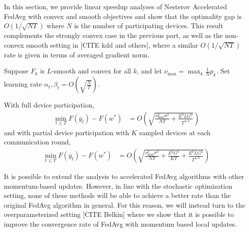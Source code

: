 In this section, we provide linear speedup analyses of Nesterov Accelerated
FedAvg with convex and smooth objectives and show that the optimality
gap is $O(1/\sqrt{NT})$ where $N$ is the number of participating
devices. This result complements the strongly convex case in the previous
part, as well as the non-convex smooth setting in {[}CITE kdd and
others{]}, where a similar $O(1/\sqrt{NT})$ rate is given in terms
of averaged gradient norm. 
\begin{theorem}
	Suppose $F_{k}$ is $L$-smooth and convex for all $k$, and let $\nu_{\max}=\max_{k}\frac{1}{N}p_{k}$.
	Set learning rate $\alpha_{t},\beta_{t}=O(\sqrt{\frac{N}{T}})$.
	
	With full device participation, 
	\begin{align*}
	\min_{t\leq T}F(\overline{y}_{t})-F(w^{\ast}) & =O(\sqrt{\frac{\nu_{\max}^{2}\sigma^{2}}{NT}+\frac{E^{2}LG^{2}}{T^{4/3}}})
	\end{align*}
	and with partial device participation with $K$ sampled devices at
	each communication round, 
	\begin{align*}
	\min_{t\leq T}F(\overline{y}_{t})-F(w^{\ast}) & =O(\sqrt{\frac{\nu_{\max}^{2}\sigma^{2}}{NT}+\frac{E^{2}G^{2}}{KT}+\frac{E^{2}LG^{2}}{T^{4/3}}})
	\end{align*}
\end{theorem}
%
\begin{remark}
	It is possible to extend the analysis to accelerated FedAvg algorithms
	with other momentum-based updates. However, in line with the stochastic
	optimization setting, none of these methods will be able to achieve
	a better rate than the original FedAvg algorithm in general. For this
	reason, we will instead turn to the overparameterized setting {[}CITE
	Belkin{]} where we show that it is possible to improve the convergence
	rate of FedAvg with momentum based local updates. 
\end{remark}